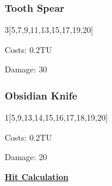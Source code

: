 \subsubsection{Tooth Spear}
3[5,7,9,11,13,15,17,19,20]\par
Costs: 0.2TU\par
Damage: 30\par

\subsubsection{Obsidian Knife}
1[5,9,13,14,15,16,17,18,19,20]\par
Costs: 0.2TU\par
Damage: 20 \par
\hyperref[subsec:hit]{\textbf{Hit Calculation}} \par
[0,1,10,20,80,100,150]



